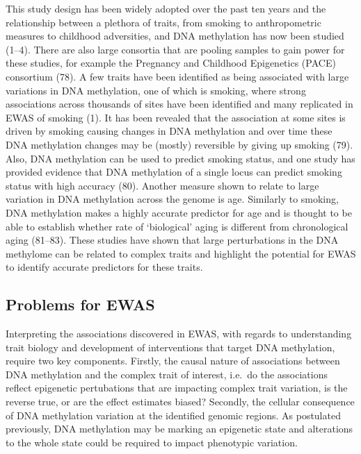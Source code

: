 \documentclass[11pt,twoside]{bristolthesis}
\begin{document}
This study design has been widely adopted over the past ten years and the relationship between a plethora of traits, from smoking to anthropometric measures to childhood adversities, and DNA methylation has now been studied (1--4). There are also large consortia that are pooling samples to gain power for these studies, for example the Pregnancy and Childhood Epigenetics (PACE) consortium (78). A few traits have been identified as being associated with large variations in DNA methylation, one of which is smoking, where strong associations across thousands of sites have been identified and many replicated in EWAS of smoking (1). It has been revealed that the association at some sites is driven by smoking causing changes in DNA methylation and over time these DNA methylation changes may be (mostly) reversible by giving up smoking (79). Also, DNA methylation can be used to predict smoking status, and one study has provided evidence that DNA methylation of a single locus can predict smoking status with high accuracy (80). Another measure shown to relate to large variation in DNA methylation across the genome is age. Similarly to smoking, DNA methylation makes a highly accurate predictor for age and is thought to be able to establish whether rate of `biological' aging is different from chronological aging (81--83). These studies have shown that large perturbations in the DNA methylome can be related to complex traits and highlight the potential for EWAS to identify accurate predictors for these traits.

\hypertarget{problems-for-ewas}{%
\subsection{Problems for EWAS}\label{problems-for-ewas}}

Interpreting the associations discovered in EWAS, with regards to understanding trait biology and development of interventions that target DNA methylation, require two key components. Firstly, the causal nature of associations between DNA methylation and the complex trait of interest, i.e.~do the associations reflect epigenetic pertubations that are impacting complex trait variation, is the reverse true, or are the effect estimates biased? Secondly, the cellular consequence of DNA methylation variation at the identified genomic regions. As postulated previously, DNA methylation may be marking an epigenetic state and alterations to the whole state could be required to impact phenotypic variation.
\end{document}

